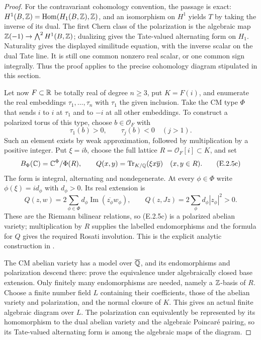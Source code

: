 \begin{proof}
For the contravariant cohomology convention, the passage is exact: $H^1(B,\mathbb Z)=\operatorname{Hom}(H_1(B,\mathbb Z),\mathbb Z)$, and an isomorphism on $H^1$ yields $T$ by taking the inverse of its dual. The first Chern class of the polarization is the algebraic map $\mathbb Z(-1)\to\bigwedge^2 H^1(B,\mathbb Z)$; dualizing gives the Tate-valued alternating form on $H_1$. Naturality gives the displayed similitude equation, with the inverse scalar on the dual Tate line. It is still one common nonzero real scalar, or one common sign integrally. Thus the proof applies to the precise cohomology diagram stipulated in this section.

Let now $F\subset\mathbb R$ be totally real of degree $n\ge3$, put $K=F(i)$, and enumerate the real embeddings $\tau_1,\ldots,\tau_n$ with $\tau_1$ the given inclusion. Take the CM type $\Phi$ that sends $i$ to $i$ at $\tau_1$ and to $-i$ at all other embeddings. To construct a polarized torus of this type, choose $b\in\mathcal O_F$ with
\[
 \tau_1(b)>0,\qquad \tau_j(b)<0\quad(j>1).
\]
Such an element exists by weak approximation, followed by multiplication by a positive integer. Put $\xi=ib$, choose the full lattice $R=\mathcal O_F[i]\subset K$, and set
\[
 B_\Phi(\mathbb C)=\mathbb C^\Phi/\Phi(R),\qquad
 Q(x,y)=\operatorname{Tr}_{K/\mathbb Q}(\xi x\overline y)
             \quad(x,y\in R).
 \tag{E.2.5c}
\]
The form is integral, alternating and nondegenerate. At every $\phi\in\Phi$ write $\phi(\xi)=i d_\phi$ with $d_\phi>0$. Its real extension is
\[
 Q(z,w)=2\sum_{\phi\in\Phi}
                d_\phi\operatorname{Im}(\overline{z_\phi}w_\phi),
 \qquad
 Q(z,Jz)=2\sum_\phi d_\phi|z_\phi|^2>0.
\]
These are the Riemann bilinear relations, so (E.2.5c) is a polarized abelian variety; multiplication by $R$ supplies the labelled endomorphisms and the formula for $Q$ gives the required Rosati involution. This is the explicit analytic construction in \cite[Example 2.11 and Proposition 3.17]{GenMilneCM2020}.

The CM abelian variety has a model over $\overline{\mathbb Q}$, and its endomorphisms and polarization descend there: \cite[Proposition 7.9 and Corollary 7.10, pp.~54--55]{GenMilneCM2020} prove the equivalence under algebraically closed base extension. Only finitely many endomorphisms are needed, namely a $\mathbb Z$-basis of $R$. Choose a finite number field $L$ containing their coefficients, those of the abelian variety and polarization, and the normal closure of $K$. This gives an actual finite algebraic diagram over $L$. The polarization can equivalently be represented by its homomorphism to the dual abelian variety and the algebraic Poincar\'e pairing, so its Tate-valued alternating form is among the algebraic maps of the diagram.


\end{proof}
